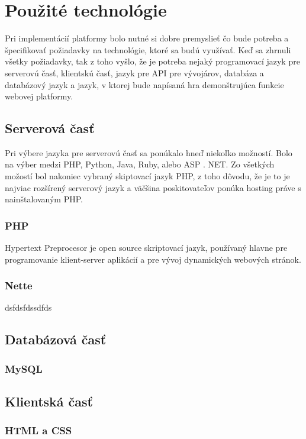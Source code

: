 \chapter{Použité technológie}
Pri implementácií platformy bolo nutné si dobre premyslieť čo bude potreba a špecifikovať požiadavky na technológie, ktoré sa budú využívať. Keď sa zhrnuli všetky požiadavky, tak z toho vyšlo, že je potreba nejaký programovací jazyk pre serverovú časť, klientskú časť, jazyk pre API pre vývojárov, databáza a databázový jazyk a jazyk, v ktorej bude napísaná hra demonštrujúca funkcie webovej platformy.

\section{Serverová časť}
Pri výbere jazyka pre serverovú časť sa ponúkalo hneď niekoľko možností. Bolo na výber medzi PHP, Python, Java, Ruby, alebo ASP . NET. Zo všetkých možostí bol nakoniec vybraný skiptovací jazyk PHP, z toho dôvodu, že je to je najviac rozšírený serverový jazyk a väčšina poskitovateľov ponúka hosting práve s nainštalovaným PHP. 

\subsection{PHP}
Hypertext Preprocesor je open source skriptovací jazyk, používaný hlavne pre programovanie klient-server aplikácií a pre vývoj dynamických webových stránok.

\subsection{Nette}
dsfdsfdssdfds

\section{Databázová časť}

\subsection{MySQL}

\section{Klientská časť}

\subsection{HTML a CSS}

